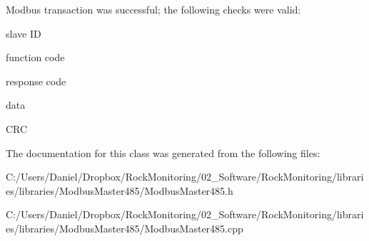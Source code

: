 Modbus transaction was successful; the following checks were valid\+:
\begin{DoxyItemize}
\item slave ID
\item function code
\item response code
\item data
\item C\+RC 
\end{DoxyItemize}

The documentation for this class was generated from the following files\+:\begin{DoxyCompactItemize}
\item 
C\+:/\+Users/\+Daniel/\+Dropbox/\+Rock\+Monitoring/02\+\_\+\+Software/\+Rock\+Monitoring/libraries/libraries/\+Modbus\+Master485/Modbus\+Master485.\+h\item 
C\+:/\+Users/\+Daniel/\+Dropbox/\+Rock\+Monitoring/02\+\_\+\+Software/\+Rock\+Monitoring/libraries/libraries/\+Modbus\+Master485/Modbus\+Master485.\+cpp\end{DoxyCompactItemize}
